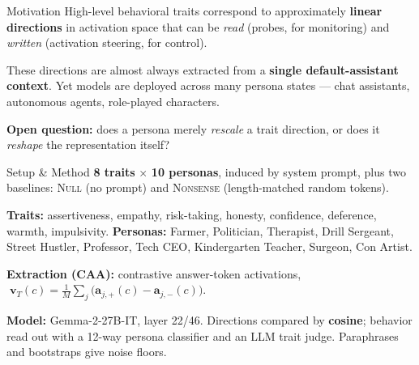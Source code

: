 \documentclass{article}
\newcommand{\bodysize}{\fontsize{21}{26}\selectfont\color{ink}}
\begin{document}
\noindent
\begin{minipage}[t]{0.485\textwidth}
\begin{posterblock}[equal height group=row1]{Motivation}
\bodysize
High-level behavioral traits correspond to approximately \textbf{linear directions} in activation space that can be \emph{read} (probes, for monitoring) and \emph{written} (activation steering, for control).

\smallskip
These directions are almost always extracted from a \textbf{single default-assistant context}. Yet models are deployed across many persona states --- chat assistants, autonomous agents, role-played characters.

\vspace{4mm}
{\color{midblue}\textbf{Open question:}} does a persona merely \emph{rescale} a trait direction, or does it \emph{reshape} the representation itself?
\end{posterblock}
\end{minipage}\hfill
\begin{minipage}[t]{0.505\textwidth}
\begin{posterblock}[equal height group=row1]{Setup \& Method}
\bodysize
\textbf{8 traits} $\times$ \textbf{10 personas}, induced by system prompt, plus two baselines: \textsc{Null} (no prompt) and \textsc{Nonsense} (length-matched random tokens).

\smallskip
\textbf{Traits:} assertiveness, empathy, risk-taking, honesty, confidence, deference, warmth, impulsivity. \textbf{Personas:} Farmer, Politician, Therapist, Drill Sergeant, Street Hustler, Professor, Tech CEO, Kindergarten Teacher, Surgeon, Con Artist.

\smallskip
\textbf{Extraction (CAA):} contrastive answer-token activations,
$\;\mathbf{v}_{T}(c) = \tfrac{1}{M}\sum_j\big(\mathbf{a}_{j,+}(c)-\mathbf{a}_{j,-}(c)\big).$

\smallskip
\textbf{Model:} Gemma-2-27B-IT, layer 22/46. Directions compared by \textbf{cosine}; behavior read out with a 12-way persona classifier and an LLM trait judge. Paraphrases and bootstraps give noise floors.
\end{posterblock}
\end{minipage}
\end{document}
